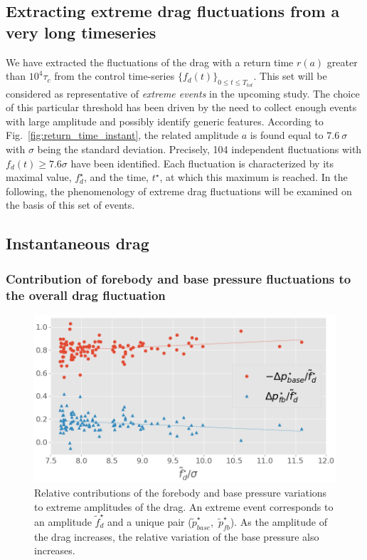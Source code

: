 \documentclass[pre,aps,floatfix,10pt,superscriptaddress, notitlepage,preprint]{revtex4-1}
\newcommand{\TL}[1]{{\color{mygreen}{#1}}}
\begin{document}



\subsection{Extracting extreme drag fluctuations from a very long timeseries}
\label{sec:extreme_extraction}

%
We have extracted  the fluctuations of the drag with a return time $r(a)$ greater than  $10^4\tau_c$ from the control time-series $\{f_d(t)\}_{0 \leq t \leq T_{tot}}$. This set will be considered as representative of \emph{extreme events} in the upcoming study. The choice of this particular threshold has been driven by the need to collect enough events with large amplitude and possibly identify generic features.
%
According to Fig.~\ref{fig:return_time_instant}, the related amplitude $a$ is found equal to $7.6~\sigma$ with $\sigma$ being the standard deviation. Precisely, 104 independent fluctuations with $f_d(t) \geq 7.6\sigma$ have been identified. Each fluctuation is characterized by its maximal value, $f_d^{\star}$, and the time, $t^{\star}$, at which this maximum is reached.
%
In the following, the phenomenology of extreme drag fluctuations will be examined on the basis of this set of events.

\subsection{Instantaneous drag}
\label{sec:instantaneous_drag}

\subsubsection{Contribution of forebody and base pressure fluctuations to the overall drag fluctuation}
\label{sec:forebody_and_base_contribution}

\begin{figure}
	\centering
	\includegraphics[width=.8\linewidth]{pressure_ratio/pressure_ratio.png}
	\caption{\label{fig:pressure_ratio} Relative contributions of the forebody and base pressure variations to extreme amplitudes of the drag. An extreme event corresponds to an amplitude $\tilde f^{\star}_d$ and a unique pair  ($\tilde{p}^{\star}_{base}$,~$\tilde{p}^{\star}_{fb}$).
	As the amplitude of the drag increases, the relative variation of the base pressure also increases. 
}
\end{figure}
\end{document}
